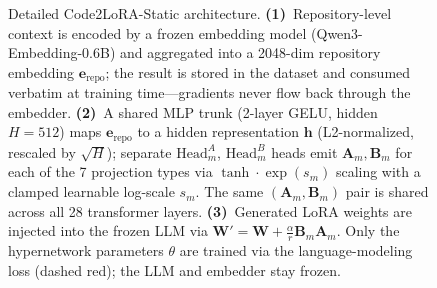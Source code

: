 \documentclass[11pt]{article}
\newcommand{\codelora}{Code2LoRA\xspace}
\newcommand{\codelorastatic}{\codelora-Static\xspace}
\begin{document}
\begin{figure}[t]
\begin{center}
{%
}%


\caption{Detailed \codelorastatic{} architecture.
\textbf{(1)}~Repository-level context is encoded by a frozen embedding model (Qwen3-Embedding-0.6B) and aggregated into a 2048-dim repository embedding $\mathbf{e}_{\text{repo}}$; the result is stored in the dataset and consumed verbatim at training time---gradients never flow back through the embedder.
\textbf{(2)}~A shared MLP trunk (2-layer GELU, hidden $H{=}512$) maps $\mathbf{e}_{\text{repo}}$ to a hidden representation $\mathbf{h}$ (L2-normalized, rescaled by $\sqrt{H}$); separate $\text{Head}^A_m$, $\text{Head}^B_m$ heads emit $\mathbf{A}_m, \mathbf{B}_m$ for each of the 7 projection types via $\tanh\cdot\exp(s_m)$ scaling with a clamped learnable log-scale $s_m$. The same $(\mathbf{A}_m, \mathbf{B}_m)$ pair is shared across all 28 transformer layers.
\textbf{(3)}~Generated LoRA weights are injected into the frozen LLM via $\mathbf{W}' = \mathbf{W} + \tfrac{\alpha}{r}\mathbf{B}_m\mathbf{A}_m$.
Only the hypernetwork parameters $\theta$ are trained via the language-modeling loss (dashed red); the LLM and embedder stay frozen.}
\label{fig:architecture_static}
\end{center}
\end{figure}
\end{document}
